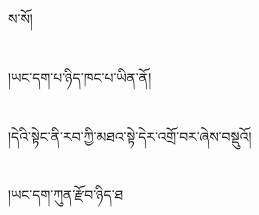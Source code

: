 ས་སོ།\chapter{ }།ཡང་དག་པ་ཉིད་ཁང་པ་ཡིན་ནོ།\chapter{ }།དེའི་སྟེང་ནི་རབ་ཀྱི་མཐའ་སྟེ་དེར་འགྲོ་བར་ཞེས་བསྡུའོ།\chapter{ }།ཡང་དག་ཀུན་རྫོབ་ཉིད་ཐ